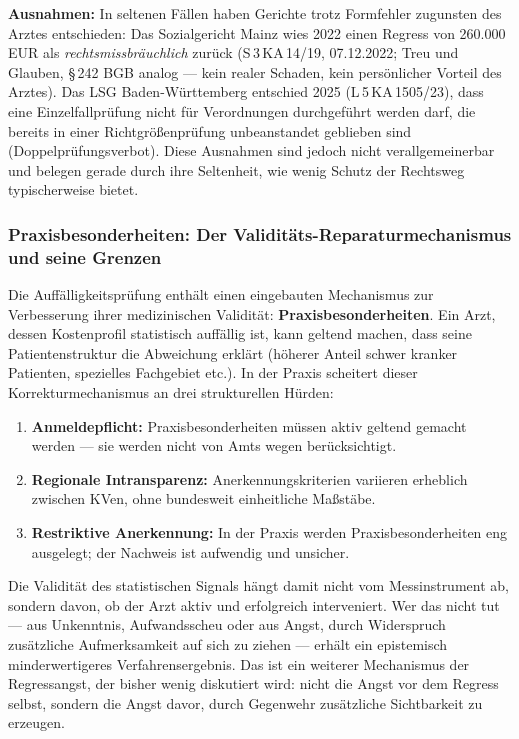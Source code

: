 \documentclass{umbruch-position}
\begin{document}
\textbf{Ausnahmen:} In seltenen Fällen haben Gerichte trotz Formfehler zugunsten des Arztes entschieden: Das Sozialgericht Mainz wies 2022 einen Regress von 260.000\,EUR als \textit{rechtsmissbräuchlich} zurück (S\,3\,KA\,14/19, 07.12.2022; Treu und Glauben, \S\,242 BGB analog --- kein realer Schaden, kein persönlicher Vorteil des Arztes). Das LSG Baden-Württemberg entschied 2025 (L\,5\,KA\,1505/23), dass eine Einzelfallprüfung nicht für Verordnungen durchgeführt werden darf, die bereits in einer Richtgrößenprüfung unbeanstandet geblieben sind (Doppelprüfungsverbot). Diese Ausnahmen sind jedoch nicht verallgemeinerbar und belegen gerade durch ihre Seltenheit, wie wenig Schutz der Rechtsweg typischerweise bietet.

\subsubsection{Praxisbesonderheiten: Der Validitäts-Reparaturmechanismus und seine Grenzen}

Die Auffälligkeitsprüfung enthält einen eingebauten Mechanismus zur Verbesserung ihrer medizinischen Validität: \textbf{Praxisbesonderheiten}. Ein Arzt, dessen Kostenprofil statistisch auffällig ist, kann geltend machen, dass seine Patientenstruktur die Abweichung erklärt (höherer Anteil schwer kranker Patienten, spezielles Fachgebiet etc.). In der Praxis scheitert dieser Korrekturmechanismus an drei strukturellen Hürden:

\begin{enumerate}[nosep]
  \item \textbf{Anmeldepflicht:} Praxisbesonderheiten müssen aktiv geltend gemacht werden --- sie werden nicht von Amts wegen berücksichtigt.
  \item \textbf{Regionale Intransparenz:} Anerkennungskriterien variieren erheblich zwischen KVen, ohne bundesweit einheitliche Maßstäbe.
  \item \textbf{Restriktive Anerkennung:} In der Praxis werden Praxisbesonderheiten eng ausgelegt; der Nachweis ist aufwendig und unsicher.
\end{enumerate}

Die Validität des statistischen Signals hängt damit nicht vom Messinstrument ab, sondern davon, ob der Arzt aktiv und erfolgreich interveniert. Wer das nicht tut --- aus Unkenntnis, Aufwandsscheu oder aus Angst, durch Widerspruch zusätzliche Aufmerksamkeit auf sich zu ziehen --- erhält ein epistemisch minderwertigeres Verfahrensergebnis. Das ist ein weiterer Mechanismus der Regressangst, der bisher wenig diskutiert wird: nicht die Angst vor dem Regress selbst, sondern die Angst davor, durch Gegenwehr zusätzliche Sichtbarkeit zu erzeugen.
\end{document}
